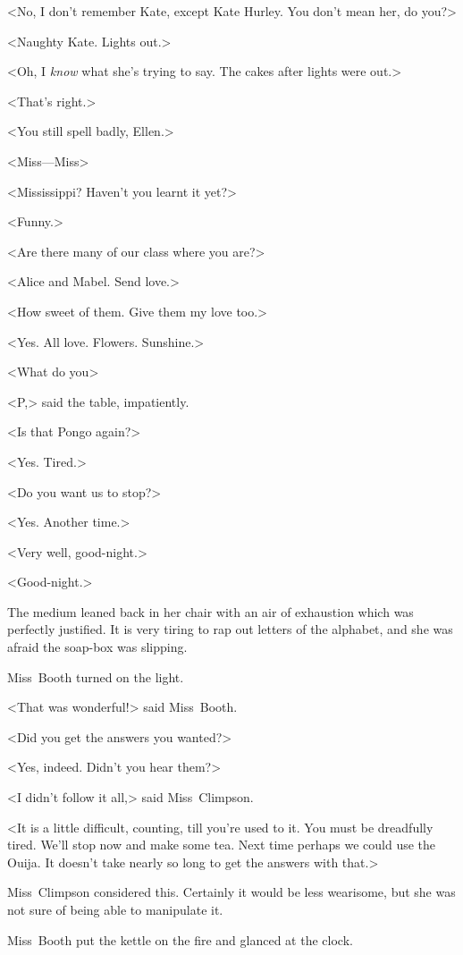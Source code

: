 <No, I don't remember Kate, except Kate Hurley. You don't mean her, do you?>

<Naughty Kate. Lights out.>

<Oh, I \emph{know} what she's trying to say. The cakes after lights were out.>

<That's right.>

<You still spell badly, Ellen.>

<Miss—Miss\longdash>

<Mississippi? Haven't you learnt it yet?>

<Funny.>

<Are there many of our class where you are?>

<Alice and Mabel. Send love.>

<How sweet of them. Give them my love too.>

<Yes. All love. Flowers. Sunshine.>

<What do you\longdash>

<P,> said the table, impatiently.

<Is that Pongo again?>

<Yes. Tired.>

<Do you want us to stop?>

<Yes. Another time.>

<Very well, good-night.>

<Good-night.>

The medium leaned back in her chair with an air of exhaustion which was perfectly justified. It is very tiring to rap out letters of the alphabet, and she was afraid the soap-box was slipping.

Miss~Booth turned on the light.

<That was wonderful!> said Miss~Booth.

<Did you get the answers you wanted?>

<Yes, indeed. Didn't you hear them?>

<I didn't follow it all,> said Miss~Climpson.

<It is a little difficult, counting, till you're used to it. You must be dreadfully tired. We'll stop now and make some tea. Next time perhaps we could use the Ouija. It doesn't take nearly so long to get the answers with that.>

Miss~Climpson considered this. Certainly it would be less wearisome, but she was not sure of being able to manipulate it.

Miss~Booth put the kettle on the fire and glanced at the clock.

